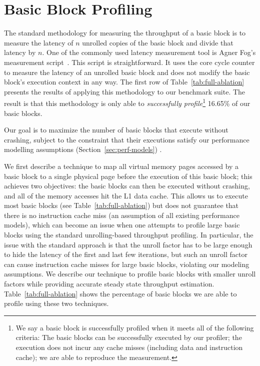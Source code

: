 \section{Basic Block Profiling}
The standard methodology for measuring the throughput of a basic block
is to measure the latency of $n$ unrolled copies of the basic block
and divide that latency by $n$.
One of the commonly used latency measurement tool is Agner Fog's measurement script~\cite{agner}.
This script is straightforward. 
It uses the core cycle counter to measure the latency of an unrolled basic block and
does not modify the basic block's execution context in any way.
The first row of Table~\ref{tab:full-ablation} presents the results of applying
this methodology to our benchmark suite. 
The result is that this methodology is only able to {\em successfully profile}\footnote{
We say a basic block is successfully profiled when it meets all of the following criteria:
The basic blocks can be successfully executed by our profiler;
the execution does not incur any cache misses (including data and instruction cache);
we are able to reproduce the measurement.
} 16.65\% of our basic blocks.


Our goal is to maximize the number of basic blocks that execute without crashing, subject to the constraint that their executions satisfy our performance modelling assumptions (Section~\ref{sec:perf-models}) .

We first describe a technique to map all virtual memory pages accessed by a basic block
to a single physical page before the execution of this basic block;
this achieves two objectives: the basic blocks can then be executed without crashing,
and all of the memory accesses hit the L1 data cache.
This allows us to execute most basic blocks (see Table~\ref{tab:full-ablation})
but does not guarantee that there is no instruction cache
miss (an assumption of all existing performance models),
which can become an issue when one attempts to profile large basic blocks using
the standard unrolling-based throughput profiling.
In particular, the issue with the standard approach is that the unroll factor
has to be large enough to hide the latency of the first and last few iterations,
but such an unroll factor can cause instruction cache misses for large basic blocks,
violating our modeling assumptions.
We describe our technique to profile basic blocks with smaller
unroll factors while providing accurate steady state throughput estimation.
Table~\ref{tab:full-ablation} shows the percentage of basic blocks
we are able to profile using these two techniques.

